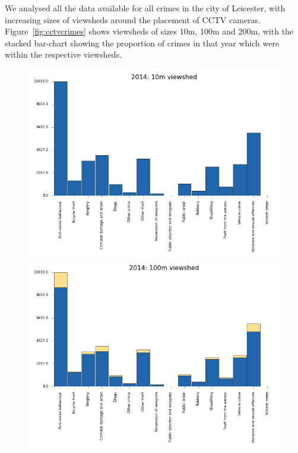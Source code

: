 \documentclass[conference]{IEEEtran}
\begin{document}
We analysed all the data available for all
crimes in the city of Leicester, with increasing sizes of viewsheds
around the placement of CCTV cameras. Figure~\ref{fig:cctvcrimes}
shows viewsheds of sizes 10m, 100m and 200m, with the stacked
bar-chart showing the proportion of crimes in that year which were
within the respective viewsheds.

\begin{figure}[!htp]
\centering
\includegraphics[width=\columnwidth]{images/2014-10m.png}
\includegraphics[width=\columnwidth]{images/2014-100m.png}

\end{figure}
\end{document}
